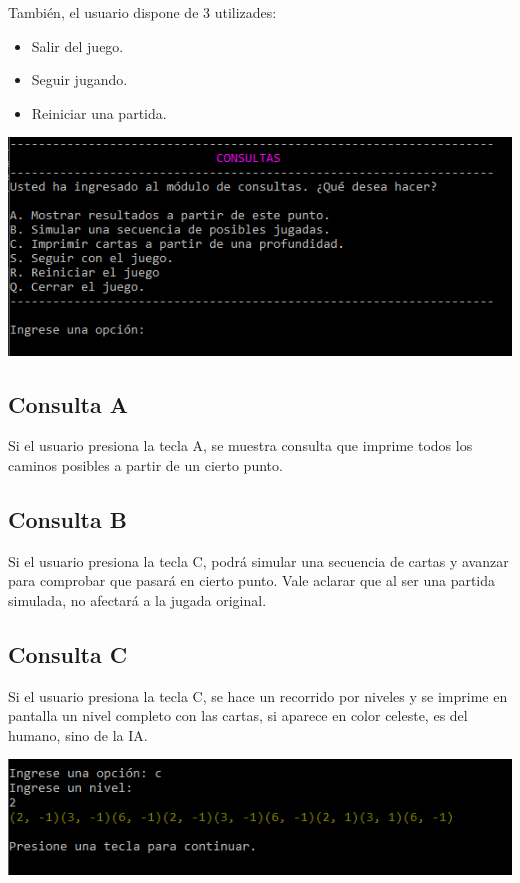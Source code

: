 \documentclass[12pt,a4paper]{article}
\begin{document}
También, el usuario dispone de 3 utilizades:
\begin{itemize}
\item Salir del juego.
\item Seguir jugando.
\item Reiniciar una partida.
\end{itemize}
\begin{center}
\includegraphics[scale=0.7]{captura3.PNG} 
\end{center}
\subsection{Consulta A}
Si el usuario presiona la tecla A, se muestra consulta que imprime todos los caminos posibles a partir de un cierto punto. 
\subsection{Consulta B}
Si el usuario presiona la tecla C, podrá simular una secuencia de cartas y avanzar para comprobar que pasará en cierto punto.
Vale aclarar que al ser una partida simulada, no afectará a la jugada original.
\subsection{Consulta C}
Si el usuario presiona la tecla C, se hace un recorrido por niveles y se imprime en pantalla un nivel completo con las cartas, si aparece en color celeste, es del humano, sino de la IA.
\begin{center}
\includegraphics[scale=0.8]{captura4.PNG} 
\end{center}
\newpage
\end{document}
